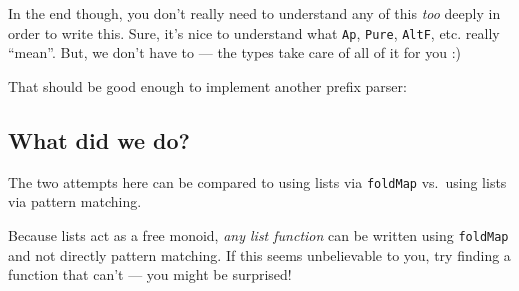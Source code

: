 \documentclass[]{article}
\newenvironment{Shaded}{}{}
\newcommand{\DataTypeTok}[1]{\textcolor[rgb]{0.56,0.13,0.00}{#1}}
\newcommand{\DecValTok}[1]{\textcolor[rgb]{0.25,0.63,0.44}{#1}}
\newcommand{\FunctionTok}[1]{\textcolor[rgb]{0.02,0.16,0.49}{#1}}
\newcommand{\NormalTok}[1]{#1}
\newcommand{\OperatorTok}[1]{\textcolor[rgb]{0.40,0.40,0.40}{#1}}
\newcommand{\StringTok}[1]{\textcolor[rgb]{0.25,0.44,0.63}{#1}}
\begin{document}
In the end though, you don't really need to understand any of this \emph{too}
deeply in order to write this. Sure, it's nice to understand what \texttt{Ap},
\texttt{Pure}, \texttt{AltF}, etc. really ``mean''. But, we don't have to ---
the types take care of all of it for you :)

That should be good enough to implement another prefix parser:

\begin{Shaded}
\end{Shaded}

\subsection{What did we do?}\label{what-did-we-do}

The two attempts here can be compared to using lists via \texttt{foldMap}
vs.~using lists via pattern matching.

Because lists act as a free monoid, \emph{any list function} can be written
using \texttt{foldMap} and not directly pattern matching. If this seems
unbelievable to you, try finding a function that can't --- you might be
surprised!
\end{document}
